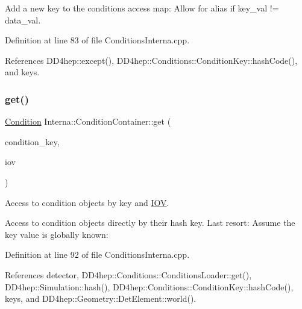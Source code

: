 Add a new key to the conditions access map\+: Allow for alias if key\+\_\+val != data\+\_\+val. 



Definition at line 83 of file Conditions\+Interna.\+cpp.



References D\+D4hep\+::except(), D\+D4hep\+::\+Conditions\+::\+Condition\+Key\+::hash\+Code(), and keys.

\hypertarget{class_d_d4hep_1_1_conditions_1_1_interna_1_1_condition_container_ada5a5cdd50a235e4fd239c4bec4f721b}{}\label{class_d_d4hep_1_1_conditions_1_1_interna_1_1_condition_container_ada5a5cdd50a235e4fd239c4bec4f721b} 
\subsubsection{\texorpdfstring{get()}{get()}\hspace{0.1cm}{\footnotesize\ttfamily [1/4]}}
{\footnotesize\ttfamily \hyperlink{class_d_d4hep_1_1_conditions_1_1_condition}{Condition} Interna\+::\+Condition\+Container\+::get (\begin{DoxyParamCaption}\item[{const std\+::string \&}]{condition\+\_\+key,  }\item[{const \hyperlink{class_d_d4hep_1_1_conditions_1_1_interna_1_1_condition_container_aa697bd92da7a05031b5eef63bb9f000b}{iov\+\_\+type} \&}]{iov }\end{DoxyParamCaption})}



Access to condition objects by key and \hyperlink{class_d_d4hep_1_1_i_o_v}{I\+OV}. 

Access to condition objects directly by their hash key. Last resort\+: Assume the key value is globally known\+: 

Definition at line 92 of file Conditions\+Interna.\+cpp.



References detector, D\+D4hep\+::\+Conditions\+::\+Conditions\+Loader\+::get(), D\+D4hep\+::\+Simulation\+::hash(), D\+D4hep\+::\+Conditions\+::\+Condition\+Key\+::hash\+Code(), keys, and D\+D4hep\+::\+Geometry\+::\+Det\+Element\+::world().



